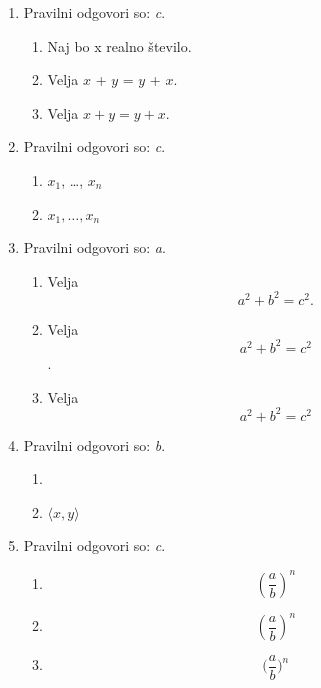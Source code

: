 \documentclass[11pt]{article}
\begin{document}
\begin{enumerate}
    \item Pravilni odgovori so: \emph{c}.
    \begin{enumerate}
        \item Naj bo x realno število.
        \item Velja \(x\) + \(y\) = \(y\) + \(x\).
        \item Velja \(x + y = y + x\).
    \end{enumerate}

    \item Pravilni odgovori so: \emph{c}.
    \begin{enumerate}
        \item \(x_1\), \dots, \(x_n\)
        \item \(x_1, \ldots, x_n\)
    \end{enumerate}

    \item Pravilni odgovori so: \emph{a}.
    \begin{enumerate}
        \item
Velja
\[
  a^2 + b^2 = c^2.
\]
        \item
Velja
\[
  a^2 + b^2 = c^2
\]
.
        \item
Velja
\[
  a^2 + b^2 = c^2
\]
    \end{enumerate}

    \item Pravilni odgovori so: \emph{b}.
    \begin{enumerate}
        \item \(<x, y>\)
        \item \(\langle x, y \rangle\)
    \end{enumerate}

    \item Pravilni odgovori so: \emph{c}.
    \begin{enumerate}
        \item \[ (\frac{a}{b})^n \]
        \item \[ \left(\frac{a}{b}\right)^n \]
        \item \[ \Big(\frac{a}{b}\Big)^n \]
    \end{enumerate}


\end{enumerate}
\end{document}
